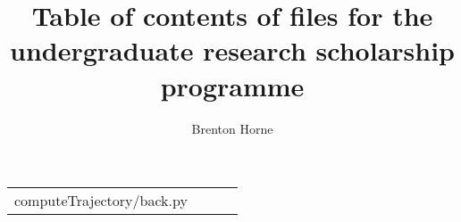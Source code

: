\documentclass[12pt,a4paper]{article}
\title{Table of contents of files for the undergraduate research scholarship programme}
\author{Brenton Horne}
\begin{document}
\maketitle

\begin{tabular}{|m{5em}|m{5em}|m{5em}|m{5em}|}
    \hline
    computeTrajectory/back.py & 
\end{tabular}
\end{document}
